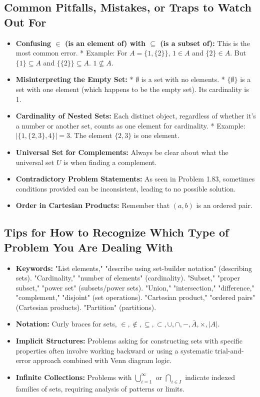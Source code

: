 \documentclass{article}
\begin{document}
\begin{itemize}
\begin{itemize}
\begin{itemize}
\begin{enumerate}
\subsection{Common Pitfalls, Mistakes, or Traps to Watch Out For}
\begin{itemize}
    \item \textbf{Confusing $\in$ (is an element of) with $\subseteq$ (is a subset of):} This is the most common error.
        *   Example: For $A = \{1, \{2\}\}$, $1 \in A$ and $\{2\} \in A$. But $\{1\} \subseteq A$ and $\{\{2\}\} \subseteq A$. $1 \not\subseteq A$.
    \item \textbf{Misinterpreting the Empty Set:}
        *   $\emptyset$ is a set with no elements.
        *   $\{\emptyset\}$ is a set with one element (which happens to be the empty set). Its cardinality is 1.
    \item \textbf{Cardinality of Nested Sets:} Each distinct object, regardless of whether it's a number or another set, counts as one element for cardinality.
        *   Example: $|\{1, \{2, 3\}, 4\}| = 3$. The element $\{2, 3\}$ is one element.
    \item \textbf{Universal Set for Complements:} Always be clear about what the universal set $U$ is when finding a complement.
    \item \textbf{Contradictory Problem Statements:} As seen in Problem 1.83, sometimes conditions provided can be inconsistent, leading to no possible solution.
    \item \textbf{Order in Cartesian Products:} Remember that $(a,b)$ is an ordered pair.
\end{itemize}

\subsection{Tips for How to Recognize Which Type of Problem You Are Dealing With}
\begin{itemize}
    \item \textbf{Keywords:} "List elements," "describe using set-builder notation" (describing sets). "Cardinality," "number of elements" (cardinality). "Subset," "proper subset," "power set" (subsets/power sets). "Union," "intersection," "difference," "complement," "disjoint" (set operations). "Cartesian product," "ordered pairs" (Cartesian products). "Partition" (partitions).
    \item \textbf{Notation:} Curly braces for sets, $\in, \notin, \subseteq, \subset, \cup, \cap, -, \bar{A}, \times, |A|$.
    \item \textbf{Implicit Structures:} Problems asking for constructing sets with specific properties often involve working backward or using a systematic trial-and-error approach combined with Venn diagram logic.
    \item \textbf{Infinite Collections:} Problems with $\bigcup_{i=1}^\infty$ or $\bigcap_{i \in I}$ indicate indexed families of sets, requiring analysis of patterns or limits.
\end{itemize}


\end{enumerate}
\end{itemize}
\end{itemize}
\end{itemize}
\end{document}
